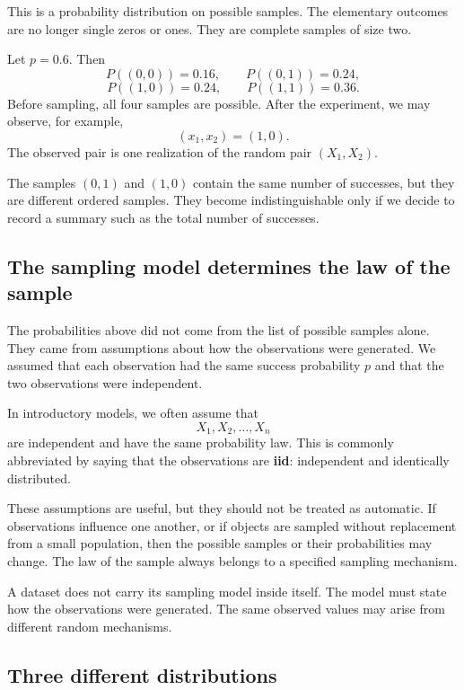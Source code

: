 This is a probability distribution on possible samples. The elementary outcomes
are no longer single zeros or ones. They are complete samples of size two.

\begin{examplebox}
Let \(p=0.6\). Then
\[
P((0,0))=0.16,\qquad P((0,1))=0.24,
\]
\[
P((1,0))=0.24,\qquad P((1,1))=0.36.
\]
Before sampling, all four samples are possible. After the experiment, we may
observe, for example,
\[
(x_1,x_2)=(1,0).
\]
The observed pair is one realization of the random pair \((X_1,X_2)\).
\end{examplebox}

The samples \((0,1)\) and \((1,0)\) contain the same number of successes, but they
are different ordered samples. They become indistinguishable only if we decide to
record a summary such as the total number of successes.

\subsection*{The sampling model determines the law of the sample}

The probabilities above did not come from the list of possible samples alone.
They came from assumptions about how the observations were generated. We assumed
that each observation had the same success probability \(p\) and that the two
observations were independent.

In introductory models, we often assume that
\[
X_1,X_2,\ldots,X_n
\]
are independent and have the same probability law. This is commonly abbreviated
by saying that the observations are \textbf{iid}: independent and identically
distributed.

These assumptions are useful, but they should not be treated as automatic. If
observations influence one another, or if objects are sampled without
replacement from a small population, then the possible samples or their
probabilities may change. The law of the sample always belongs to a specified
sampling mechanism.

\begin{remarkbox}
A dataset does not carry its sampling model inside itself. The model must state
how the observations were generated. The same observed values may arise from
different random mechanisms.
\end{remarkbox}

\subsection*{Three different distributions}

